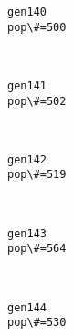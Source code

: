 \documentclass[11pt]{article}
\begin{document}
    \begin{Verbatim}[commandchars=\\\{\}]
gen140
pop\#=500

    \end{Verbatim}

    \begin{center}
    \end{center}
    { \hspace*{\fill} \\}
    
    \begin{Verbatim}[commandchars=\\\{\}]
gen141
pop\#=502

    \end{Verbatim}

    \begin{center}
    \end{center}
    { \hspace*{\fill} \\}
    
    \begin{Verbatim}[commandchars=\\\{\}]
gen142
pop\#=519

    \end{Verbatim}

    \begin{center}
    \end{center}
    { \hspace*{\fill} \\}
    
    \begin{Verbatim}[commandchars=\\\{\}]
gen143
pop\#=564

    \end{Verbatim}

    \begin{center}
    \end{center}
    { \hspace*{\fill} \\}
    
    \begin{Verbatim}[commandchars=\\\{\}]
gen144
pop\#=530

    \end{Verbatim}
\end{document}
